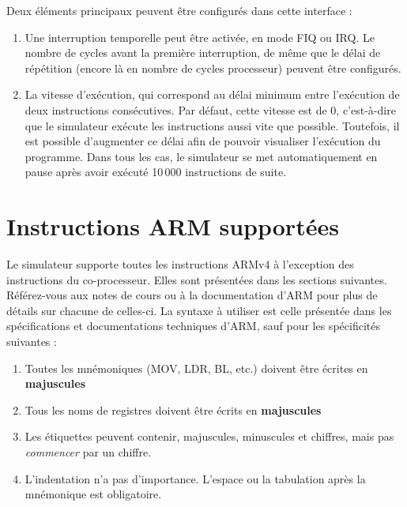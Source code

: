 \documentclass{tufte-handout}
\begin{document}
Deux éléments principaux peuvent être configurés dans cette interface :
\begin{enumerate}
	\item Une interruption temporelle peut être activée, en mode FIQ ou IRQ. Le nombre de cycles avant la première interruption, de même que le délai de répétition (encore là en nombre de cycles processeur) peuvent être configurés.
	\item La vitesse d'exécution, qui correspond au délai minimum entre l'exécution de deux instructions consécutives. Par défaut, cette vitesse est de 0, c'est-à-dire que le simulateur exécute les instructions aussi vite que possible. Toutefois, il est possible d'augmenter ce délai afin de pouvoir visualiser l'exécution du programme. Dans tous les cas, le simulateur se met automatiquement en pause après avoir exécuté 10\,000 instructions de suite.
\end{enumerate}

\clearpage
\section{Instructions ARM supportées}

Le simulateur supporte toutes les instructions ARMv4 à l'exception des instructions du co-processeur. Elles sont présentées dans les sections suivantes. Référez-vous aux notes de cours ou à la documentation d'ARM pour plus de détails sur chacune de celles-ci. La syntaxe à utiliser est celle présentée dans les spécifications et documentations techniques d'ARM, sauf pour les spécificités suivantes :
\begin{enumerate}
	\item Toutes les mnémoniques (MOV, LDR, BL, etc.) doivent être écrites en \textbf{majuscules}
	\item Tous les noms de registres doivent être écrits en \textbf{majuscules}
	\item Les étiquettes peuvent contenir, majuscules, minuscules et chiffres, mais pas \textit{commencer} par un chiffre.
	\item L'indentation n'a pas d'importance. L'espace ou la tabulation après la mnémonique est obligatoire.

\end{enumerate}
\end{document}
